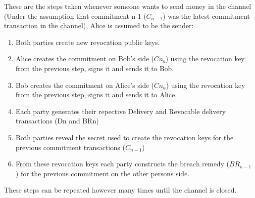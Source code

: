 These are the steps taken whenever someone wants to send money in the channel (Under the assumption that commitment n-1 ($C_{n-1}$) was the latest commitment transaction in the channel), Alice is assumed to be the sender: 
\begin{enumerate}
	\item Both parties create new revocation public keys.
	\item Alice creates the commitment on Bob's side ($Cn_{b}$) using the revocation key from the previous step, signs it and sends it to Bob.
	\item Bob creates the commitment on Alice's side ($Cn_{a}$) using the revocation key from the previous step, signs it and sends it to Alice.
	\item Each party generates their repective Delivery and Revocable delivery transactions (Dn and BRn)
	\item Both parties reveal the secret used to create the revocation keys for the previous commitment transactions ($C_{n-1}$)
	\item From these revocation keys each party constructs the breach remedy ($BR_{n-1}$) for the previous commitment on the other persons side.
\end{enumerate}

These steps can be repeated however many times until the channel is closed. 

